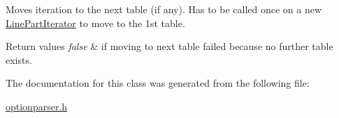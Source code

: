 \-Moves iteration to the next table (if any). \-Has to be called once on a new \hyperlink{classoption_1_1_print_usage_implementation_1_1_line_part_iterator}{\-Line\-Part\-Iterator} to move to the 1st table. 


\begin{DoxyRetVals}{\-Return values}
{\em false} & if moving to next table failed because no further table exists. \\
\hline
\end{DoxyRetVals}


\-The documentation for this class was generated from the following file\-:\begin{DoxyCompactItemize}
\item 
\hyperlink{optionparser_8h}{optionparser.\-h}\end{DoxyCompactItemize}

